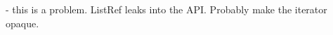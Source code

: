 
\begin{DoxyRefList}
\item[Member \mbox{\hyperlink{group__group__bufferchain_ga8b133dfacd84ddc281bba80690fa49ef}{Buffer\+Chain\+Iter}} ]\label{todo__todo000001}%
%
-\/ this is a problem. List\+Ref leaks into the API. Probably make the iterator opaque. 
\end{DoxyRefList}
